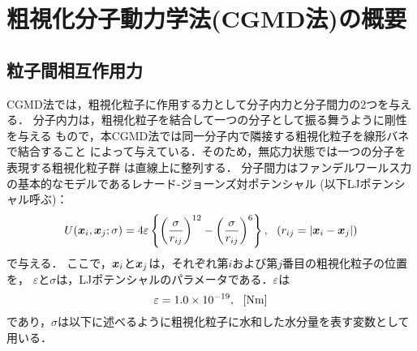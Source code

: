 ﻿\section{粗視化分子動力学法(CGMD法)の概要}
\subsection{粒子間相互作用力}
CGMD法では，粗視化粒子に作用する力として分子内力と分子間力の2つを与える．
分子内力は，粗視化粒子を結合して一つの分子として振る舞うように剛性を与える
もので，本CGMD法では同一分子内で隣接する粗視化粒子を線形バネで結合すること
によって与えている．そのため，無応力状態では一つの分子を表現する粗視化粒子群
は直線上に整列する．
分子間力はファンデルワールス力の基本的なモデルであるレナード-ジョーンズ対ポテンシャル
(以下LJポテンシャル呼ぶ)：
\begin{equation}
	U(\mbox{\boldmath $x$}_i,\mbox{\boldmath $x$}_j; \sigma) 
	= 4 \varepsilon 
	\left\{ 
	\left(\frac{\sigma}{r_{ij}}\right)^{12}
	-
	\left(\frac{\sigma}{r_{ij}}\right)^6
	\right\}, \ \ \left( r_{ij}=\left| \mbox{\boldmath $x$}_i-\mbox{\boldmath $x$}_j\right| \right)
	\label{eqn:LJ}
\end{equation}
で与える．
ここで，$\mbox{\boldmath $x$}_i$と$\mbox{\boldmath $x$}_j$は，それぞれ第$i$および第$j$番目の粗視化粒子の位置を，
$\varepsilon$と$\sigma$は，LJポテンシャルのパラメータである．$\varepsilon$は
\begin{equation}
	\varepsilon=1.0\times 10^{-19}, \ \ [{\rm Nm}]
	\label{eqn:eps_of_LJ}
\end{equation}
であり，$\sigma$は以下に述べるように粗視化粒子に水和した水分量を表す変数として用いる．

